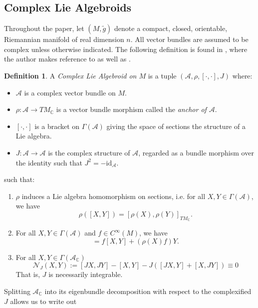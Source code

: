 \documentclass{amsart}
\newcommand{\C}{\mathbb{C}}
\newcommand{\ra}{\rightarrow}
\newcommand{\id}{\text{id}}
\theoremstyle{definition}
\newtheorem{definition}[theorem]{Definition}
\newcommand{\A}{\mathcal{A}}
\theoremstyle{definition}
\begin{document}
\subsection{Complex Lie Algebroids}
Throughout the paper, let $(M,\tilde{g})$ denote a compact, closed, orientable, Riemannian manifold of real dimension $n$. All vector bundles are assumed to be complex unless otherwise indicated. The following definition is found in \cite{MR4722602}, where the author makes reference to \cite{MR3483864} as well as \cite{weinstein2006integrationproblemcomplexlie}.
\begin{definition}\cite[Definition 1]{MR4722602}
    A \textit{Complex Lie Algebroid on $M$} is a tuple $(\A, \rho, [\cdot, \cdot], J)$ where:
    \begin{itemize}
        \item $\A$ is a complex vector bundle on $M$.
        \item $\rho:\A \ra TM_\C$ is a vector bundle morphism called the \textit{anchor of $\A$}.
        \item $[\cdot , \cdot]$ is a bracket on $\Gamma(\A)$ giving the space of sections the structure of a Lie algebra.
        \item $J: \A \ra \A$ is the complex structure of $\A$, regarded as a bundle morphism over the identity such that $J^2=-\id_\A$.
    \end{itemize}
    such that:
    \begin{enumerate}
        \item $\rho$ induces a Lie algebra homomorphism on sections, i.e. for all $X,Y \in \Gamma(\A)$, we have
        \begin{equation*}
            \rho([X,Y]) = [\rho(X), \rho(Y)]_{TM_\C}.
        \end{equation*}
        \item For all $X,Y \in \Gamma(\A)$ and $f \in C^\infty(M)$, we have
        \begin{equation*}
            [X,fY] = f[X,Y]+(\rho(X)f)Y.
        \end{equation*}
        \item For all $X,Y \in \Gamma(\A_\C)$
    \begin{equation*}
        \mathcal{N}_{J}(X,Y) := [JX,JY] - [X,Y] - J([JX,Y]+[X,JY]) \equiv 0
    \end{equation*}
    That is, $J$ is necessarily integrable.
    \end{enumerate}
\end{definition}
 Splitting $\A_\C$ into its eigenbundle decomposition with respect to the complexified $J$ allows us to write out
\end{document}

